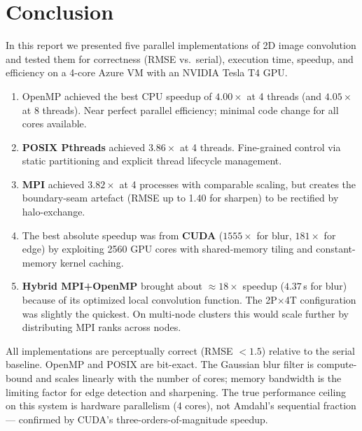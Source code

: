 ﻿\documentclass[12pt,a4paper]{article}
\begin{document}
\section{Conclusion}

In this report we presented five parallel implementations of 2D image convolution
and tested them for correctness (RMSE vs.\ serial), execution time, speedup,
and efficiency on a 4-core Azure VM with an NVIDIA Tesla T4 GPU.

\begin{enumerate}
  \item OpenMP achieved the best CPU speedup of $4.00\times$ at 4 threads
        (and $4.05\times$ at 8 threads). Near perfect parallel efficiency; minimal code change
        for all cores available.
  \item \textbf{POSIX Pthreads} achieved $3.86\times$ at 4 threads.
        Fine-grained control via static partitioning and explicit thread lifecycle management.
  \item \textbf{MPI} achieved $3.82\times$ at 4 processes with comparable
        scaling, but creates the boundary-seam artefact
        (RMSE up to 1.40 for sharpen) to be rectified by halo-exchange.
  \item The best absolute speedup was from \textbf{CUDA}
        ($1555\times$ for blur, $181\times$ for edge) by exploiting 2560
        GPU cores with shared-memory tiling and constant-memory kernel caching.
  \item \textbf{Hybrid MPI+OpenMP} brought about $\approx\!18\times$ speedup
        ($4.37$\,s for blur) because of its optimized local convolution function.
        The 2P$\times$4T configuration was slightly the quickest. On multi-node
        clusters this would scale further by distributing MPI ranks
        across nodes.
\end{enumerate}

All implementations are perceptually correct (RMSE $< 1.5$) relative to the
serial baseline. OpenMP and POSIX are bit-exact. The Gaussian blur filter
is compute-bound and scales linearly with the number of cores;
memory bandwidth is the limiting factor for edge detection and sharpening. The true performance ceiling on
this system is hardware parallelism (4 cores), not Amdahl's sequential
fraction --- confirmed by CUDA's three-orders-of-magnitude speedup.
\end{document}
